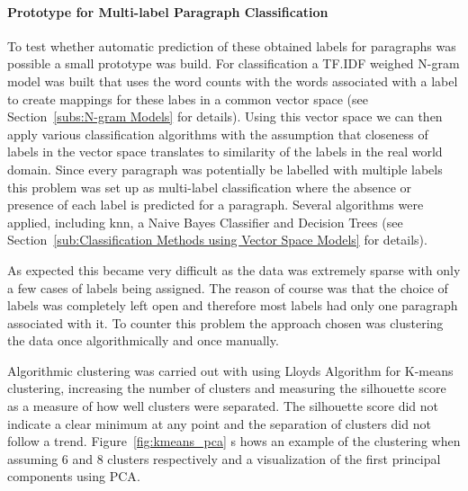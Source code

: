 \paragraph{Prototype for Multi-label Paragraph Classification}
\label{par:Prototype for Multi-label Paragraph Classification}

To test whether automatic prediction of these obtained labels for paragraphs was possible a small prototype was build. For classification a TF.IDF weighed N-gram model was built that uses the word counts with the words associated with a label to create mappings for these labes in a common vector space (see Section~\ref{subs:N-gram Models} for details). Using this vector space we can then apply various classification algorithms with the assumption that closeness of labels in the vector space translates to similarity of the labels in the real world domain. Since every paragraph was potentially be labelled with multiple labels this problem was set up as multi-label classification where the absence or presence of each label is predicted for a paragraph. Several algorithms were applied, including \gls{knn}, a Naive Bayes Classifier and Decision Trees (see Section~\ref{sub:Classification Methods using Vector Space Models} for details).

As expected this became very difficult as the data was extremely sparse with only a few cases of labels being assigned. The reason of course was that the choice of labels was completely left open and therefore most labels had only one paragraph associated with it.
To counter this problem the approach chosen was clustering the data once algorithmically and once manually.

Algorithmic clustering was carried out with using \gls{Lloyds Algorithm} for \gls{K-means clustering}, increasing the number of clusters and measuring the \gls{silhouette score} as a measure of how well clusters were separated. The silhouette score did not indicate a clear minimum at any point and the separation of clusters did not follow a trend. Figure~\ref{fig:kmeans_pca} s
hows an example of the clustering when assuming 6 and 8 clusters respectively and a visualization of the first principal components using \gls{PCA}.

